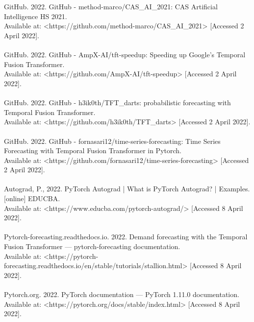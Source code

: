 \documentclass{article}
\begin{document}
\\\\
GitHub. 2022. GitHub - method-marco/CAS_AI_2021: CAS Artificial Intelligence HS 2021.\\ [online] Available at: <https://github.com/method-marco/CAS_AI_2021> [Accessed 2 April 2022].
\\\\
GitHub. 2022. GitHub - AmpX-AI/tft-speedup: Speeding up Google's Temporal Fusion Transformer.\\ [online] Available at: <https://github.com/AmpX-AI/tft-speedup> [Accessed 2 April 2022].
\\\\
GitHub. 2022. GitHub - h3ik0th/TFT_darts: probabilistic forecasting with Temporal Fusion Transformer.\\ [online] Available at: <https://github.com/h3ik0th/TFT_darts> [Accessed 2 April 2022].
\\\\
GitHub. 2022. GitHub - fornasari12/time-series-forecasting: Time Series Forecasting with Temporal Fusion Transformer in Pytorch.\\ [online] Available at: <https://github.com/fornasari12/time-series-forecasting> [Accessed 2 April 2022].
\\\\
Autograd, P., 2022. PyTorch Autograd | What is PyTorch Autograd? | Examples. [online] EDUCBA. \\Available at: <https://www.educba.com/pytorch-autograd/> [Accessed 8 April 2022].
\\\\
Pytorch-forecasting.readthedocs.io. 2022. Demand forecasting with the Temporal Fusion Transformer — pytorch-forecasting documentation. \\[online] Available at: <https://pytorch-forecasting.readthedocs.io/en/stable/tutorials/stallion.html> [Accessed 8 April 2022].
\\\\
Pytorch.org. 2022. PyTorch documentation — PyTorch 1.11.0 documentation. \\[online] Available at: <https://pytorch.org/docs/stable/index.html> [Accessed 8 April 2022].

\clearpage
\end{document}
